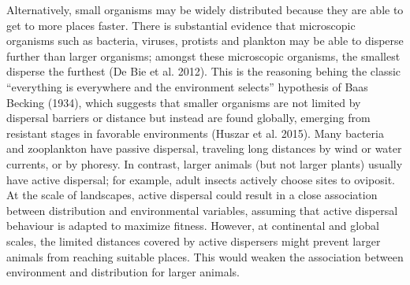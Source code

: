 \documentclass[12pt,]{article}
\begin{document}
Alternatively, small organisms may be widely distributed because they
are able to get to more places faster. There is substantial evidence
that microscopic organisms such as bacteria, viruses, protists and
plankton may be able to disperse further than larger organisms; amongst
these microscopic organisms, the smallest disperse the furthest (De Bie
et al. 2012). This is the reasoning behing the classic ``everything is
everywhere and the environment selects'' hypothesis of Baas Becking
(1934), which suggests that smaller organisms are not limited by
dispersal barriers or distance but instead are found globally, emerging
from resistant stages in favorable environments (Huszar et al. 2015).
Many bacteria and zooplankton have passive dispersal, traveling long
distances by wind or water currents, or by phoresy. In contrast, larger
animals (but not larger plants) usually have active dispersal; for
example, adult insects actively choose sites to oviposit. At the scale
of landscapes, active dispersal could result in a close association
between distribution and environmental variables, assuming that active
dispersal behaviour is adapted to maximize fitness. However, at
continental and global scales, the limited distances covered by active
dispersers might prevent larger animals from reaching suitable places.
This would weaken the association between environment and distribution
for larger animals.
\end{document}
